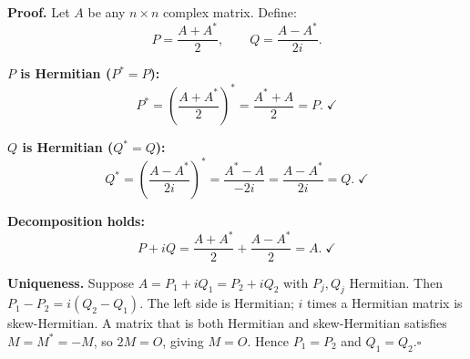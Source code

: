 \documentclass[12pt,a3paper]{article}
\begin{document}
\begin{tcolorbox}[enhanced,breakable,
  colback=cG!4,colframe=cG,boxrule=0.8pt,arc=5pt,
  title={\textbf{Answer --- Every Square Matrix $= P + iQ$, $P$ and $Q$ Hermitian}},
  fonttitle=\bfseries\color{white},colbacktitle=cG]

\textbf{Proof.} Let $A$ be any $n\times n$ complex matrix. Define:
\[
P=\frac{A+A^*}{2},\qquad Q=\frac{A-A^*}{2i}.
\]

\textbf{$P$ is Hermitian ($P^*=P$):}
\[
P^*=\left(\frac{A+A^*}{2}\right)^*=\frac{A^*+A}{2}=P.\;\checkmark
\]

\textbf{$Q$ is Hermitian ($Q^*=Q$):}
\[
Q^*=\left(\frac{A-A^*}{2i}\right)^*=\frac{A^*-A}{-2i}=\frac{A-A^*}{2i}=Q.\;\checkmark
\]

\textbf{Decomposition holds:}
\[
P+iQ=\frac{A+A^*}{2}+\frac{A-A^*}{2}=A.\;\checkmark
\]

\textbf{Uniqueness.} Suppose $A=P_1+iQ_1=P_2+iQ_2$ with $P_j,Q_j$ Hermitian.
Then $P_1-P_2=i(Q_2-Q_1)$.
The left side is Hermitian; $i$ times a Hermitian matrix is skew-Hermitian.
A matrix that is both Hermitian and skew-Hermitian satisfies $M=M^*=-M$, so $2M=O$, giving $M=O$.
Hence $P_1=P_2$ and $Q_1=Q_2$.\hfill$\square$

\end{tcolorbox}
\end{document}
